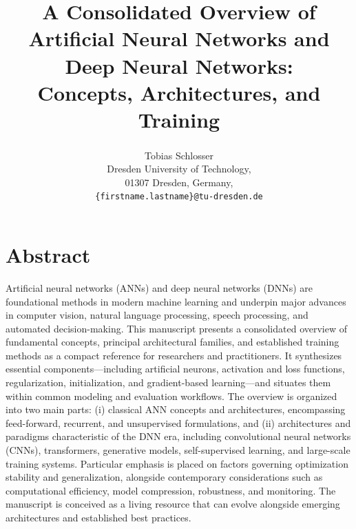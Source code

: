 \documentclass{article}
\newcommand{\ORCID}[1]{\textsuperscript{\href{https://orcid.org/#1}{\textcolor[HTML]{A6CE39}{\faOrcid}}}}
\newcommand{\ORCIDSchlosser}{0000-0002-0682-4284} %
\begin{document}
\title{\Huge A Consolidated Overview of \\ Artificial Neural Networks and \\ Deep Neural Networks: \\ Concepts, Architectures, and Training}

\author{
    Tobias Schlosser\ORCID{\ORCIDSchlosser} \\[1ex]
    Dresden University of Technology, \\
    01307 Dresden, Germany, \\
    \texttt{\{firstname.lastname\}@tu-dresden.de}
}




\maketitle




\section*{Abstract}

Artificial neural networks (ANNs) and deep neural networks (DNNs) are foundational methods in modern machine learning and underpin major advances in computer vision, natural language processing, speech processing, and automated decision-making. This manuscript presents a consolidated overview of fundamental concepts, principal architectural families, and established training methods as a compact reference for researchers and practitioners. It synthesizes essential components---including artificial neurons, activation and loss functions, regularization, initialization, and gradient-based learning---and situates them within common modeling and evaluation workflows. The overview is organized into two main parts: (i) classical ANN concepts and architectures, encompassing feed-forward, recurrent, and unsupervised formulations, and (ii) architectures and paradigms characteristic of the DNN era, including convolutional neural networks (CNNs), transformers, generative models, self-supervised learning, and large-scale training systems. Particular emphasis is placed on factors governing optimization stability and generalization, alongside contemporary considerations such as computational efficiency, model compression, robustness, and monitoring. The manuscript is conceived as a living resource that can evolve alongside emerging architectures and established best practices.
\end{document}

